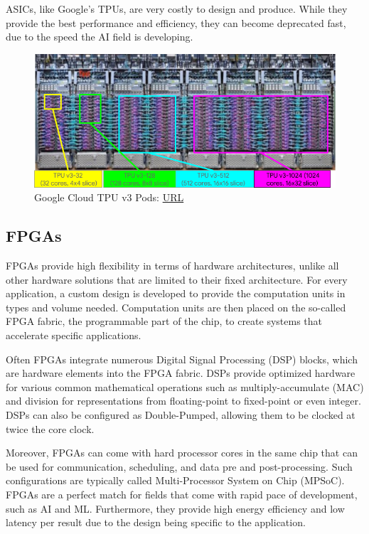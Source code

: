 ASICs, like Google's TPUs, are very costly to design and produce. While they provide the best performance and efficiency, they can become deprecated fast, due to the speed the AI field is developing.

\begin{figure} [H]
	\centering
	\includegraphics[width=\textwidth]{Images/Hardware/tpu-v3-pods.png}
	\decoRule
	\caption[Google Cloud TPU v3 Pods]{Google Cloud TPU v3 Pods: \href{https://cloud.google.com/tpu/docs/system-architecture}{URL}}
	\label{fig:tpu-v3-pods}
\end{figure}

\subsection{FPGAs}
FPGAs provide high flexibility in terms of hardware architectures, unlike all other hardware solutions that are limited to their fixed architecture. For every application, a custom design is developed to provide the computation units in types and volume needed. Computation units are then placed on the so-called FPGA fabric, the programmable part of the chip, to create systems that accelerate specific applications.

Often FPGAs integrate numerous Digital Signal Processing (DSP) blocks, which are hardware elements into the FPGA fabric. DSPs provide optimized hardware for various common mathematical operations such as multiply-accumulate (MAC) and division for representations from floating-point to fixed-point or even integer. DSPs can also be configured as Double-Pumped, allowing them to be clocked at twice the core clock.

Moreover, FPGAs can come with hard processor cores in the same chip that can be used for communication, scheduling, and data pre and post-processing. Such configurations are typically called Multi-Processor System on Chip (MPSoC). FPGAs are a perfect match for fields that come with rapid pace of development, such as AI and ML. Furthermore, they provide high energy efficiency and low latency per result due to the design being specific to the application.

